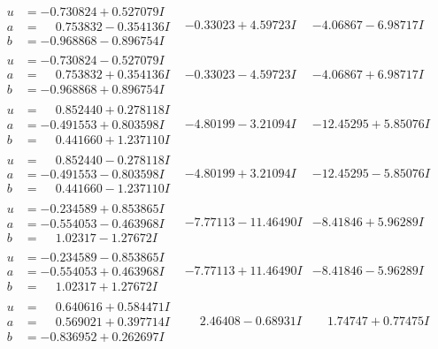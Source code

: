 \documentclass[1p]{elsarticle_modified}
\theoremstyle{definition}
\begin{document}
$$\begin{array}{c|c|c}
\begin{aligned}
u &= -0.730824 + 0.527079 I \\
a &= \phantom{-}0.753832 - 0.354136 I \\
b &= -0.968868 - 0.896754 I\end{aligned}
 & -0.33023 + 4.59723 I & -4.06867 - 6.98717 I \\ \hline\begin{aligned}
u &= -0.730824 - 0.527079 I \\
a &= \phantom{-}0.753832 + 0.354136 I \\
b &= -0.968868 + 0.896754 I\end{aligned}
 & -0.33023 - 4.59723 I & -4.06867 + 6.98717 I \\ \hline\begin{aligned}
u &= \phantom{-}0.852440 + 0.278118 I \\
a &= -0.491553 + 0.803598 I \\
b &= \phantom{-}0.441660 + 1.237110 I\end{aligned}
 & -4.80199 - 3.21094 I & -12.45295 + 5.85076 I \\ \hline\begin{aligned}
u &= \phantom{-}0.852440 - 0.278118 I \\
a &= -0.491553 - 0.803598 I \\
b &= \phantom{-}0.441660 - 1.237110 I\end{aligned}
 & -4.80199 + 3.21094 I & -12.45295 - 5.85076 I \\ \hline\begin{aligned}
u &= -0.234589 + 0.853865 I \\
a &= -0.554053 - 0.463968 I \\
b &= \phantom{-}1.02317 - 1.27672 I\end{aligned}
 & -7.77113 - 11.46490 I & -8.41846 + 5.96289 I \\ \hline\begin{aligned}
u &= -0.234589 - 0.853865 I \\
a &= -0.554053 + 0.463968 I \\
b &= \phantom{-}1.02317 + 1.27672 I\end{aligned}
 & -7.77113 + 11.46490 I & -8.41846 - 5.96289 I \\ \hline\begin{aligned}
u &= \phantom{-}0.640616 + 0.584471 I \\
a &= \phantom{-}0.569021 + 0.397714 I \\
b &= -0.836952 + 0.262697 I\end{aligned}
 & \phantom{-}2.46408 - 0.68931 I & \phantom{-}1.74747 + 0.77475 I \\ \hline\begin{aligned}

\end{aligned}
\end{array}$$
\end{document}
